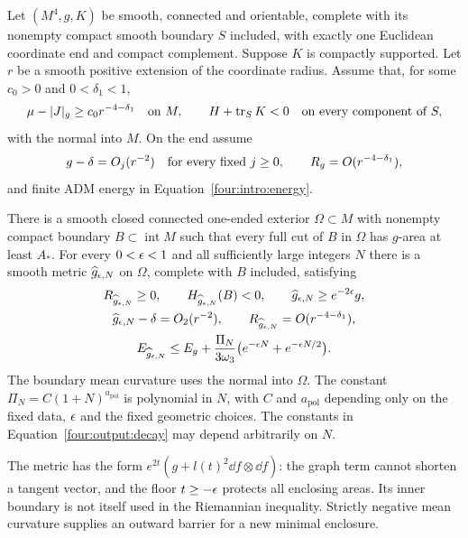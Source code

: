 \begin{theorem}
\label{four:thm:boundary-deformation}
Let $(M^4,g,K)$ be smooth, connected and orientable, complete with its
nonempty compact smooth boundary $S$ included, with exactly one Euclidean
coordinate end and compact complement. Suppose $K$ is compactly supported.
Let $r$ be a smooth positive extension of the coordinate radius. Assume
that, for some $c_0>0$ and $0<\delta_1<1$,
\[
 \mu-|J|_g\ge c_0r^{-4-\delta_1}\quad\hbox{on }M,
 \qquad H+\operatorname{tr}_SK<0\quad\hbox{on every component of }S,
\]
with the normal into $M$. On the end assume
\[
 g-\delta=O_j(r^{-2})\quad\hbox{for every fixed }j\ge0,
 \qquad R_g=O(r^{-4-\delta_1}),
\]
and finite ADM energy in Equation~\eqref{four:intro:energy}.

There is a smooth closed connected one-ended exterior $\Omega\subset M$
with nonempty compact boundary $B\subset\operatorname{int}M$ such that
every full cut of $B$ in $\Omega$ has $g$-area at least $A_*$.
For every $0<\epsilon<1$ and all sufficiently large integers $N$ there is a
smooth metric $\widehat g_{\epsilon,N}$ on $\Omega$, complete with $B$
included, satisfying
\begin{gather}
 R_{\widehat g_{\epsilon,N}}\ge0,\qquad
 H_{\widehat g_{\epsilon,N}}(B)<0,
 \qquad \widehat g_{\epsilon,N}\ge e^{-2\epsilon}g,
                      \label{four:output:geometry}\\
 \widehat g_{\epsilon,N}-\delta=O_2(r^{-2}),\qquad
 R_{\widehat g_{\epsilon,N}}=O(r^{-4-\delta_1}),
                      \label{four:output:decay}\\
 E_{\widehat g_{\epsilon,N}}\le E_g+
 \frac{\Pi_N}{3\omega_3}
       \bigl(e^{-\epsilon N}+e^{-\epsilon N/2}\bigr).
                      \label{four:output:energy}
\end{gather}
The boundary mean curvature uses the normal into $\Omega$. The constant
$\Pi_N=C(1+N)^{a_{\mathrm{pol}}}$ is polynomial in $N$, with $C$ and
$a_{\mathrm{pol}}$ depending only
on the fixed data, $\epsilon$ and the fixed geometric choices. The constants
in Equation~\eqref{four:output:decay} may depend arbitrarily on $N$.
\end{theorem}

The metric has the form $e^{2t}(g+l(t)^2\dd f\otimes\dd f)$: the graph
term cannot shorten a tangent vector, and the floor $t\ge-\epsilon$ protects
all enclosing areas. Its inner boundary is not itself used in the
Riemannian inequality. Strictly negative mean curvature supplies an
outward barrier for a new minimal enclosure.

